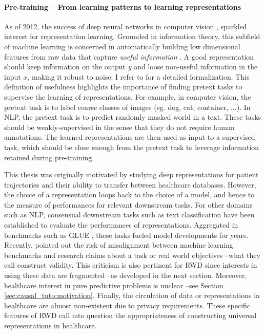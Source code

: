 \documentclass[french,12pt,twoside,a4paper]{book}
\begin{document}
\begin{background_box_left}

  \paragraph{Pre-training -- From learning patterns to learning representations}
  As of 2012, the success of deep neural networks in computer vision
  \citep{krizhevsky2012imagenet}, sparkled interest for representation learning.
  Grounded in information theory, this subfield of machine learning is concerned
  in automatically building low dimensional features from raw data that capture
  \emph{useful information} \citep{bengio2013representation}. A good
  representation should keep information on the output $y$ and loose non-useful
  information in the input $x$, making it robust to noise: I refer to
  \cite{achille2018emergence} for a detailed formalization. This definition of
  usefulness highlights the importance of finding pretext tasks to supervise the learning
  of representations. For example, in computer vision, the pretext task is to
  label coarse classes of images (eg. dog, cat, container, ...). In NLP, the
  pretext task is to predict randomly masked world in a text. These tasks should
  be weakly-supervised in the sense that they do not require human annotations.
  The learned representations are then used as input to a supervised task, which
  should be close enough from the pretext task to leverage information retained
  during pre-training.

  This thesis was originally motivated by studying deep representations for
  patient trajectories and their ability to transfer between healthcare
  databases. However, the choice of a representation loops back to the choice of
  a model, and hence to the measure of performances for relevant downstream
  tasks. For other domains such as NLP, consensual downstream tasks such as text
  classification have been established to evaluate the performances of
  representations. Aggregated in benchmarks such as GLUE \citep{wang2018glue},
  these tasks fueled model developments for years. Recently, \cite{raji2021ai}
  pointed out the risk of misalignment between machine learning benchmarks and
  research claims about a task or real world objectives --what they call
  construct validity. This criticism is also pertinent for RWD since interests
  in using these data are fragmented --as developed in the next section.
  Moreover, healthcare interest in pure predictive problems is unclear --see
  Section \ref{sec:causal_tuto:motivation}. Finally, the circulation of data or
  representations in healthcare are almost non-existent due to privacy
  requirements. These specific features of RWD call into question the
  appropriateness of constructing universal representations in healthcare.


\end{background_box_left}
\end{document}
